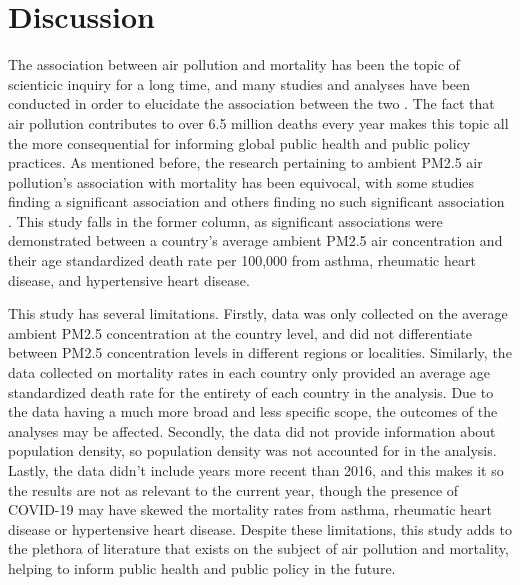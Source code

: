 \documentclass[12pt, letterpaper, twoside]{article}\usepackage[]{graphicx}\usepackage[]{xcolor}
\begin{document}
\section*{Discussion}
The association between air pollution and mortality has been the topic of
scienticic inquiry for a long time, and many studies and analyses have been
conducted in order to elucidate the association between the two
\citep{dockery1993association, sunyer1996air, jerrett2005spatial, analitis2006short}.
The fact that air pollution contributes to over 6.5 million deaths every year
\citep{fuller2022pollution} makes this topic all the more consequential for
informing global public health and public policy practices. As mentioned before,
the research pertaining to ambient PM2.5 air pollution's association with
mortality has been equivocal, with some studies finding a significant association
\citep{analitis2006short} and others finding no such significant association
\citep{khojasteh2021long}. This study falls in the former column, as
significant associations were demonstrated between a country's average ambient
PM2.5 air concentration and their age standardized death rate per 100,000 from
asthma, rheumatic heart disease, and hypertensive heart disease.\par
This study has several limitations. Firstly, data was only collected on the
average ambient PM2.5 concentration at the country level, and did not
differentiate between PM2.5 concentration levels in different regions or
localities. Similarly, the data collected on mortality rates in each country
only provided an average age standardized death rate for the entirety of each
country in the analysis. Due to the data having a much more broad and less
specific scope, the outcomes of the analyses may be affected. Secondly, the data
did not provide information about population density, so population density
was not accounted for in the analysis. Lastly, the data didn't include years
more recent than 2016, and this makes it so the results are not as relevant to
the current year, though the presence of COVID-19 may have skewed the mortality
rates from asthma, rheumatic heart disease or hypertensive heart disease. Despite
these limitations, this study adds to the plethora of literature that exists on
the subject of air pollution and mortality, helping to inform public health and
public policy in the future.
\end{document}
